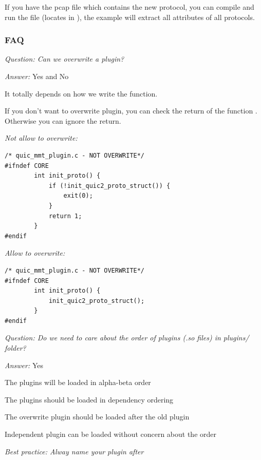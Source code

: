 If you have the pcap file which contains the new protocol, you can compile and run the file  (locates in ), the example will extract all attributes of all protocols.

\subsubsection{FAQ}

\textit{Question: Can we overwrite a plugin? }

\textit{Answer:} Yes and No

It totally depends on how we write the  function.

If you don't want to overwrite plugin, you can check the return of the function . Otherwise you can ignore the return.

\textit{Not allow to overwrite:}

\begin{lstlisting}[style=Cpp]
/* quic_mmt_plugin.c - NOT OVERWRITE*/
#ifndef CORE
        int init_proto() {
            if (!init_quic2_proto_struct()) {
                exit(0);
            }
            return 1;
        }
#endif
\end{lstlisting}

\textit{Allow to overwrite:}

\begin{lstlisting}[style=Cpp]
/* quic_mmt_plugin.c - NOT OVERWRITE*/
#ifndef CORE
        int init_proto() {
            init_quic2_proto_struct();
        }
#endif
\end{lstlisting}


\textit{Question: Do we need to care about the order of plugins (.so files) in plugins/ folder?}

\textit{Answer:} Yes

The plugins will be loaded in alpha-beta order

The plugins should be loaded in dependency ordering

The overwrite plugin should be loaded after the old plugin

Independent plugin can be loaded without concern about the order

\textit{Best practice: Alway name your plugin after }




